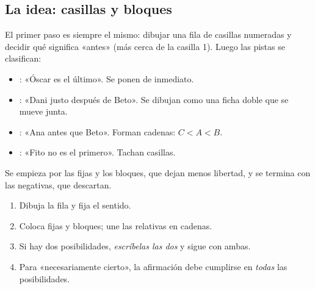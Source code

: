 

\subsection{La idea: casillas y bloques}
El primer paso es siempre el mismo: dibujar una fila de casillas numeradas y decidir qué significa «antes» (más cerca
de la casilla 1). Luego las pistas se clasifican:
\begin{itemize}
  \item {}: «Óscar es el último». Se ponen de inmediato.
  \item {}: «Dani justo después de Beto». Se dibujan como una ficha doble  que se mueve junta.
  \item {}: «Ana antes que Beto». Forman cadenas: $C < A < B$.
  \item {}: «Fito no es el primero». Tachan casillas.
\end{itemize}

Se empieza por las fijas y los bloques, que dejan menos libertad, y se termina con las negativas, que descartan.


\begin{regla}
\begin{enumerate}
  \item Dibuja la fila y fija el sentido.
  \item Coloca fijas y bloques; une las relativas en cadenas.
  \item Si hay dos posibilidades, \emph{escríbelas las dos} y sigue con ambas.
  \item Para «necesariamente cierto», la afirmación debe cumplirse en \emph{todas} las posibilidades.
\end{enumerate}
\end{regla}

